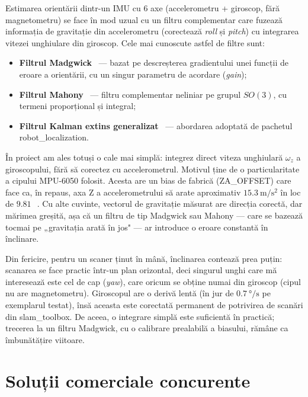 \documentclass[a4paper,12pt,twoside,openany]{report}
\renewcommand{\texttt}[1]{\textnormal{#1}}
\begin{document}
Estimarea orientării dintr-un IMU cu 6 axe (accelerometru + giroscop, fără
magnetometru) se face în mod uzual cu un filtru complementar care fuzează
informația de gravitație din accelerometru (corectează \textit{roll} și
\textit{pitch}) cu integrarea vitezei unghiulare din giroscop. Cele mai
cunoscute astfel de filtre sunt:

\begin{itemize}\itemsep0pt
    \item \textbf{Filtrul Madgwick}~\cite{madgwick2014} --- bazat pe
          descreșterea gradientului unei funcții de eroare a orientării,
          cu un singur parametru de acordare (\textit{gain});
    \item \textbf{Filtrul Mahony}~\cite{mahony2008} --- filtru
          complementar neliniar pe grupul $SO(3)$, cu termeni proporțional
          și integral;
    \item \textbf{Filtrul Kalman extins generalizat}~\cite{moore2014robotlocalization}
          --- abordarea adoptată de pachetul \texttt{robot\_localization}.
\end{itemize}

În proiect am ales totuși o cale mai simplă: integrez direct viteza unghiulară
$\omega_z$ a giroscopului, fără să corectez cu accelerometrul. Motivul ține de
o particularitate a cipului MPU-6050 folosit. Acesta are un bias de fabrică
(\texttt{ZA\_OFFSET}) care face ca, în repaus, axa Z a accelerometrului să
arate aproximativ $\SI{15.3}{\meter\per\second\squared}$ în loc de
$\SI{9.81}{}$~\cite{mpu6050regmap}. Cu alte cuvinte, vectorul de gravitație
măsurat are direcția corectă, dar mărimea greșită, așa că un filtru de tip
Madgwick sau Mahony — care se bazează tocmai pe „gravitația arată în jos" — ar
introduce o eroare constantă în înclinare.

Din fericire, pentru un scaner ținut în mână, înclinarea contează prea puțin:
scanarea se face practic într-un plan orizontal, deci singurul unghi care mă
interesează este cel de cap (\textit{yaw}), care oricum se obține numai din
giroscop (cipul nu are magnetometru). Giroscopul are o derivă lentă (în jur de
$\SI{0.7}{\degree\per\second}$ pe exemplarul testat), însă aceasta este
corectată permanent de potrivirea de scanări din slam\_toolbox. De aceea, o
integrare simplă este suficientă în practică; trecerea la un filtru Madgwick,
cu o calibrare prealabilă a biasului, rămâne ca îmbunătățire viitoare.

\section{Soluții comerciale concurente}
\label{sec:comerciale}
\end{document}
